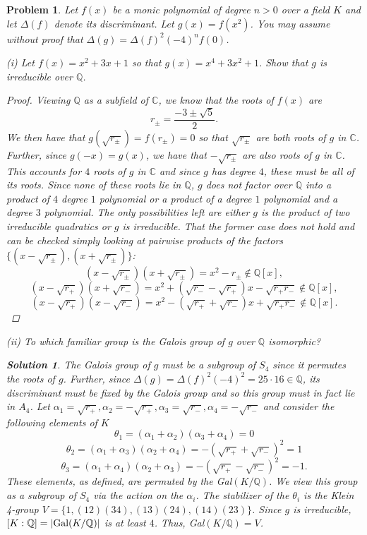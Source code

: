 \documentclass[11pt]{article}
\newcommand{\C}{\mathbb{C}}
\newcommand{\1}{\textbf{1}}
\newtheorem{prob}{Problem}
\newtheorem*{sol*}{\textit{Solution}}
\begin{document}
\begin{prob}
Let $f(x)$ be a monic polynomial of degree $n> 0$ over a field $K$ and let $\Delta(f)$ denote its discriminant. Let $g(x) = f(x^2)$. You may assume without proof that $\Delta(g) = \Delta(f)^2(-4)^n f(0)$.

\noindent (i) Let $f(x) = x^2 + 3x + 1$ so that $g(x) = x^4 + 3x^2 + 1$. Show that $g$ is irreducible over $\mathbb{Q}$. 

\begin{proof}
Viewing $\mathbb{Q}$ as a subfield of $\C$, we know that the roots of $f(x)$ are \[r_\pm = \frac{-3 \pm\sqrt{5}}{2}.\] We then have that $g(\sqrt{r_\pm}) = f(r_\pm) = 0$ so that $\sqrt{r_\pm}$ are both roots of $g$ in $\C$. Further, since $g(-x) = g(x)$, we have that $-\sqrt{r_\pm}$ are also roots of $g$ in $\C$. This accounts for $4$ roots of $g$ in $\C$ and since $g$ has degree $4$, these must be all of its roots. Since none of these roots lie in $\mathbb{Q}$, $g$ does not factor over $\mathbb{Q}$ into a product of $4$ degree $1$ polynomial or a product of a degree $1$ polynomial and a degree $3$ polynomial. The only possibilities left are either $g$ is the product of two irreducible quadratics or $g$ is irreducible. That the former case does not hold and can be checked simply looking at pairwise products of the factors $\{(x - \sqrt{r_\pm}), (x + \sqrt{r_\pm})\}$:  \[(x - \sqrt{r_\pm})(x + \sqrt{r_\pm}) = x^2 - r_\pm\notin\mathbb{Q}[x], \] \[(x - \sqrt{r_+})(x +\sqrt{r_-}) = x^2 + (\sqrt{r_-} - \sqrt{r_+})x - \sqrt{r_+ r_-}\notin\mathbb{Q}[x], \] \[(x - \sqrt{r_+})(x - \sqrt{r_-}) = x^2 - (\sqrt{r_+} + \sqrt{r_-})x + \sqrt{r_+ r_-}\notin\mathbb{Q}[x].\]
\end{proof}

\noindent (ii) To which familiar group is the Galois group of $g$ over $\mathbb{Q}$ isomorphic?

\begin{sol*}
\textnormal{The Galois group of $g$ must be a subgroup of $S_4$ since it permutes the roots of $g$. Further, since $\Delta(g) = \Delta(f)^2(-4)^2 = 25\cdot16 \in\mathbb{Q} $, its discriminant must be fixed by the Galois group and so this group must in fact lie in $A_4$. Let $\alpha_1 = \sqrt{r_+}, \alpha_2 = -\sqrt{r_+},\alpha_3 = \sqrt{r_-},\alpha_4 = -\sqrt{r_-}$ and consider the following elements of $K$ \[\theta_1 = (\alpha_1 + \alpha_2)(\alpha_3 + \alpha_4) = 0\] \[\theta_2 = (\alpha_1 + \alpha_3)(\alpha_2 + \alpha_4) = -(\sqrt{r_+} + \sqrt{r_-})^2 = 1\] \[\theta_3 = (\alpha_1 + \alpha_4)(\alpha_2 + \alpha_3) = -(\sqrt{r_+} - \sqrt{r_-})^2 = -1. \] These elements, as defined, are permuted by the Gal$(K/\mathbb{Q})$. We view this group as a subgroup of $S_4$ via the action on the $\alpha_i$. The stabilizer of the $\theta_i$ is the Klein 4-group $V = \{1, (12)(34), (13)(24), (14)(23)\}$. Since $g$ is irreducible, $[K:\mathbb{Q}] = |\textnormal{Gal}(K/\mathbb{Q})|$ is at least $4$. Thus, Gal$(K/\mathbb{Q}) = V$.}

\end{sol*}
\end{prob}
\end{document}
